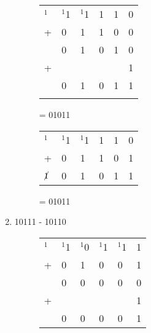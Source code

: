 \begin{enumerate}[label=(\alph*)]
\begin{figure}[H]
    \begin{minipage}[t]{0.45\textwidth}
        \begin{table}[H]
            \begin{tabularx}{0.6\textwidth}{XXXXXX}
                $^1$ & $^1$1& $^1$1& 1 & 1 & 0\\
                + & 0 & 1& 1 & 0 & 0\\
                \hline
                & 0 & 1 & 0 & 1 & 0\\
                + & & & & & 1\\
                \hline
                & 0 & 1 & 0 & 1 & 1\\
                \hline
                &  & \\
            \end{tabularx}
        \end{table}
        = 01011
    \end{minipage}\hfill
    \begin{minipage}[t]{0.45\textwidth}
        \begin{table}[H]
            \begin{tabularx}{0.6\textwidth}{XXXXXX}
                $^1$& $^1$1 & $^1$1 & 1 & 1 & 0\\
                + & 0 & 1 & 1 & 0 & 1\\
                \hline
                $\cancel{1}$ & 0 & 1 & 0 & 1 & 1 \\
                \hline
            \end{tabularx}
        \end{table}
        = 01011
    \end{minipage}\hfill
\end{figure}
\item 10111 - 10110
\begin{figure}[H]
    \begin{minipage}[t]{0.45\textwidth}
        \begin{table}[H]
            \begin{tabularx}{0.6\textwidth}{XXXXXX}
                $^1$ & $^1$1& $^1$0& $^1$1 & $^1$1 & 1\\
                + & 0 & 1& 0 & 0 & 1\\
                \hline
                & 0 & 0 & 0 & 0 & 0\\
                + & & & & & 1\\
                \hline
                & 0 & 0 & 0 & 0 & 1\\
                \hline

\end{tabularx}
\end{table}
\end{minipage}
\end{figure}
\end{enumerate}
